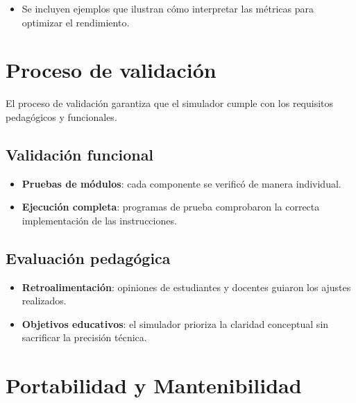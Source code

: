 \documentclass[12pt,oneside]{templates/unerthesis}
\providecommand{\tightlist}{%
  \setlength{\itemsep}{0pt}\setlength{\parskip}{0pt}}
\begin{document}
\begin{itemize}
\tightlist
\item
  Se incluyen ejemplos que ilustran cómo interpretar las métricas para optimizar el rendimiento.
\end{itemize}

\hypertarget{proceso-de-validaciuxf3n}{%
\section{Proceso de validación}\label{proceso-de-validaciuxf3n}}

El proceso de validación garantiza que el simulador cumple con los requisitos pedagógicos y funcionales.

\hypertarget{validaciuxf3n-funcional}{%
\subsection{Validación funcional}\label{validaciuxf3n-funcional}}

\begin{itemize}
\tightlist
\item
  \textbf{Pruebas de módulos}: cada componente se verificó de manera individual.
\item
  \textbf{Ejecución completa}: programas de prueba comprobaron la correcta implementación de las instrucciones.
\end{itemize}

\hypertarget{evaluaciuxf3n-pedaguxf3gica}{%
\subsection{Evaluación pedagógica}\label{evaluaciuxf3n-pedaguxf3gica}}

\begin{itemize}
\tightlist
\item
  \textbf{Retroalimentación}: opiniones de estudiantes y docentes guiaron los ajustes realizados.
\item
  \textbf{Objetivos educativos}: el simulador prioriza la claridad conceptual sin sacrificar la precisión técnica.
\end{itemize}

\hypertarget{portabilidad-y-mantenibilidad}{%
\section{Portabilidad y Mantenibilidad}\label{portabilidad-y-mantenibilidad}}
\end{document}
